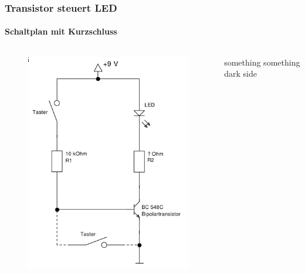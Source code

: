 \begin{frame}
    \frametitle{Transistor steuert LED}
    \framesubtitle{Schaltplan mit Kurzschluss}
    \begin{columns}[c]
        \begin{figure}[H]
        \begin{center}
                \includegraphics[scale=0.35]{./img/schaltungen/transistorLED_1.png}
        \end{center}
        \end{figure}
        something something dark side 
    \end{columns}
\end{frame}

